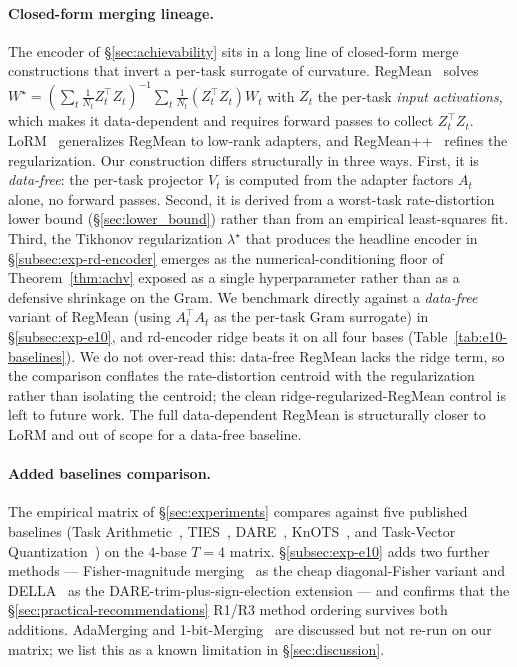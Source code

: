 \paragraph{Closed-form merging lineage.} The encoder of
\S\ref{sec:achievability} sits in a long line of closed-form merge
constructions that invert a per-task surrogate of curvature.
RegMean~\cite{jin2023regmean} solves
$W^\star = (\sum_t \tfrac{1}{N_t} Z_t^\top Z_t)^{-1}
 \sum_t \tfrac{1}{N_t} (Z_t^\top Z_t) W_t$ with $Z_t$ the per-task
\emph{input activations}, which makes it data-dependent and requires
forward passes to collect $Z_t^\top Z_t$. LoRM~\cite{lorm2024}
generalizes RegMean to low-rank adapters, and
RegMean++~\cite{regmeanpp2025} refines the regularization. Our
construction differs structurally in three ways. First, it is
\emph{data-free}: the per-task projector $V_t$ is computed from the
adapter factors $A_t$ alone, no forward passes. Second, it is derived
from a worst-task rate-distortion lower bound
(\S\ref{sec:lower_bound}) rather than from an empirical
least-squares fit. Third, the Tikhonov regularization $\lambda^\star$
that produces the headline encoder in \S\ref{subsec:exp-rd-encoder}
emerges as the numerical-conditioning floor of
Theorem~\ref{thm:achv} exposed as a single hyperparameter rather
than as a defensive shrinkage on the Gram. We benchmark directly
against a \emph{data-free} variant of RegMean (using $A_t^\top A_t$ as
the per-task Gram surrogate) in \S\ref{subsec:exp-e10}, and rd-encoder
ridge beats it on all four bases (Table~\ref{tab:e10-baselines}). We do
not over-read this: data-free RegMean lacks the ridge term, so the
comparison conflates the rate-distortion centroid with the
regularization rather than isolating the centroid; the clean
ridge-regularized-RegMean control is left to future work. The full
data-dependent RegMean is structurally closer to LoRM and out of scope
for a data-free baseline.

\paragraph{Added baselines comparison.} The empirical matrix of
\S\ref{sec:experiments} compares against five published baselines
(Task Arithmetic~\cite{ilharco2023task},
TIES~\cite{yadav2023ties}, DARE~\cite{yu2024dare},
KnOTS~\cite{stoica2025knots}, and Task-Vector
Quantization~\cite{kim2025tvq}) on the $4$-base $T = 4$ matrix.
\S\ref{subsec:exp-e10} adds two further methods --- Fisher-magnitude
merging~\cite{matena2022fisher} as the cheap diagonal-Fisher variant
and DELLA~\cite{della2024} as the DARE-trim-plus-sign-election
extension --- and confirms that the
\S\ref{sec:practical-recommendations} R1/R3 method ordering survives
both additions. AdaMerging
\cite{adamerging2024} and 1-bit-Merging~\cite{bit1merging2025} are
discussed but not re-run on our matrix; we list this as a known
limitation in \S\ref{sec:discussion}.

